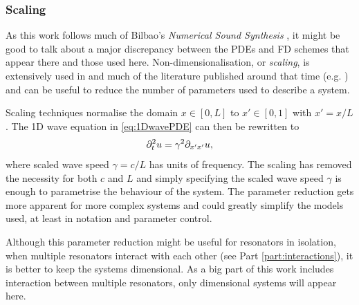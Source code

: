 \subsubsection{Scaling}
As this work follows much of Bilbao's \textit{Numerical Sound Synthesis} \cite{theBible}, it might be good to talk about a major discrepancy between the PDEs and FD schemes that appear there and those used here. Non-dimensionalisation, or \textit{scaling}, is extensively used in \cite{theBible} and much of the literature published around that time (e.g. \cite{Bilbao2009Modular,Bilbao2009spring}) and can be useful to reduce the number of parameters used to describe a system.

Scaling techniques normalise the domain $x\in[0, L]$ to $x' \in [0, 1]$ with $x' = x/L$ . The 1D wave equation in \eqref{eq:1DwavePDE} can then be rewritten to
\begin{equation}\label{eq:scaled1Dwave}
    \partial_t^2 u = \gamma^2\partial_{x'x'}u,
\end{equation}
where scaled wave speed $\gamma = c/L$ has units of frequency. The scaling has removed the necessity for both $c$ and $L$ and simply specifying the scaled wave speed $\gamma$ is enough to parametrise the behaviour of the system. The parameter reduction gets more apparent for more complex systems and could greatly simplify the models used, at least in notation and parameter control. 

Although this parameter reduction might be useful for resonators in isolation, when multiple resonators interact with each other (see Part \ref{part:interactions}), it is better to keep the systems dimensional. As a big part of this work includes interaction between multiple resonators, only dimensional systems will appear here.

